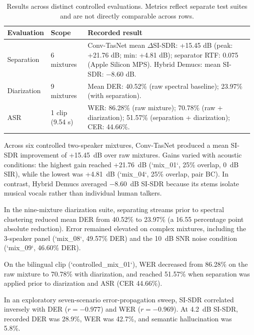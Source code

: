 \documentclass[11pt,a4paper,twocolumn]{article}
\begin{document}
\begin{table}[h]
\centering
\small
\begin{tabularx}{\linewidth}{@{}l l X@{}}
\toprule
Evaluation & Scope & Recorded result \\
\midrule
Separation & 6 mixtures & Conv-TasNet mean $\Delta$SI-SDR: +15.45 dB (peak: +21.76 dB; min: +4.81 dB); separator RTF: 0.075 (Apple Silicon MPS). Hybrid Demucs: mean SI-SDR: $-8.60$ dB. \\
Diarization & 9 mixtures & Mean DER: 40.52\% (raw spectral baseline); 23.97\% (with separation). \\
ASR & 1 clip (9.54 s) & WER: 86.28\% (raw mixture); 70.78\% (raw + diarization); 51.57\% (separation + diarization); CER: 44.66\%. \\
\bottomrule
\end{tabularx}
\caption{Results across distinct controlled evaluations. Metrics reflect separate test suites and are not directly comparable across rows.}
\label{tab:results}
\end{table}

Across six controlled two-speaker mixtures, Conv-TasNet produced a mean SI-SDR improvement of +15.45~dB over raw mixtures. Gains varied with acoustic conditions: the highest gain reached +21.76~dB (`mix\_01`, 25\% overlap, 0~dB SIR), while the lowest was +4.81~dB (`mix\_04`, 25\% overlap, pair BC). In contrast, Hybrid Demucs averaged $-8.60$~dB SI-SDR because its stems isolate musical vocals rather than individual human talkers.

In the nine-mixture diarization suite, separating streams prior to spectral clustering reduced mean DER from 40.52\% to 23.97\% (a 16.55 percentage point absolute reduction). Error remained elevated on complex mixtures, including the 3-speaker panel (`mix\_08`, 49.57\% DER) and the 10~dB SNR noise condition (`mix\_09`, 46.60\% DER).

On the bilingual clip (`controlled\_mix\_01`), WER decreased from 86.28\% on the raw mixture to 70.78\% with diarization, and reached 51.57\% when separation was applied prior to diarization and ASR (CER 44.66\%).

In an exploratory seven-scenario error-propagation sweep, SI-SDR correlated inversely with DER ($r = -0.977$) and WER ($r = -0.969$). At 4.2~dB SI-SDR, recorded DER was 28.9\%, WER was 42.7\%, and semantic hallucination was 5.8\%.
\end{document}
